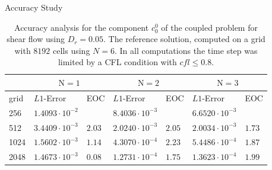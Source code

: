 
\begin{frame}{Accuracy Study}
	\scriptsize
	\begin{table}[H]
		\centering
		\begin{tabular}{|l|l|l|l|l|l|l|}
			\hline 
			& \multicolumn{2}{|c|}{$\mathrm{N}=1$} & \multicolumn{2}{|c|}{$\mathrm{N}=2$} & \multicolumn{2}{|c|}{$\mathrm{N}=3$}  \\
			\hline 
			grid & $L1$-Error & EOC  & $L1$-Error & EOC  & $L1$-Error & EOC\\
			\hline
			256  & $ 1.4093 \cdot 10^{-2}$ & & $ 8.4036 \cdot 10^{-3}$&&$6.6520  \cdot 10^{-3}$& \\
			\hline
			512 & $3.4409 \cdot 10^{-3}$ & $2.03$& $ 2.0240  \cdot 10^{-3}$&$2.05$& $ 2.0034 \cdot 10^{-3}$&$1.73$ \\
			\hline 
			1024  &$ 1.5602\cdot 10^{-3}$&$1.14$& $ 4.3070 \cdot 10^{-4}$&$2.23$ & $5.4486\cdot 10^{-4}$&$1.87$\\
			\hline
			2048 & $1.4673\cdot 10^{-3}$ &$0.08$& $ 1.2731 \cdot 10^{-4}$&$1.75$& $ 1.3623 \cdot 10^{-4}$&$1.99$\\
			\hline
		\end{tabular}
		\caption{Accuracy analysis for the component $c^0_0$ of the coupled problem for shear flow using $D_r=0.05$. The reference solution, computed on a grid with $8192$ cells using $N=6$. In all computations the time step was limited by a CFL condition with $cfl \leq 0.8$.}
		\label{tab:Dr=0.05_error_N=1,2,3vsN=6}
	\end{table}
\end{frame}



